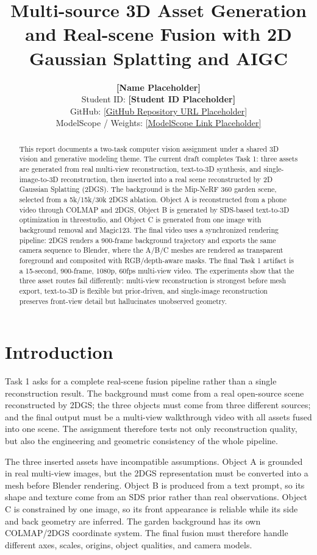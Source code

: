 \documentclass[10pt,twocolumn,letterpaper]{article}
\title{Multi-source 3D Asset Generation and Real-scene Fusion with 2D Gaussian Splatting and AIGC}
\author{
  \textbf{[Name Placeholder]} \\
  Student ID: \textbf{[Student ID Placeholder]} \\
  GitHub: \url{[GitHub Repository URL Placeholder]} \\
  ModelScope / Weights: \url{[ModelScope Link Placeholder]}
}
\date{}
\begin{document}
\maketitle

\begin{abstract}
This report documents a two-task computer vision assignment under a shared 3D vision and generative modeling theme.
The current draft completes Task 1: three assets are generated from real multi-view reconstruction, text-to-3D synthesis, and single-image-to-3D reconstruction, then inserted into a real scene reconstructed by 2D Gaussian Splatting (2DGS).
The background is the Mip-NeRF 360 garden scene, selected from a 5k/15k/30k 2DGS ablation.
Object A is reconstructed from a phone video through COLMAP and 2DGS, Object B is generated by SDS-based text-to-3D optimization in threestudio, and Object C is generated from one image with background removal and Magic123.
The final video uses a synchronized rendering pipeline: 2DGS renders a 900-frame background trajectory and exports the same camera sequence to Blender, where the A/B/C meshes are rendered as transparent foreground and composited with RGB/depth-aware masks.
The final Task 1 artifact is a 15-second, 900-frame, 1080p, 60fps multi-view video.
The experiments show that the three asset routes fail differently: multi-view reconstruction is strongest before mesh export, text-to-3D is flexible but prior-driven, and single-image reconstruction preserves front-view detail but hallucinates unobserved geometry.
\end{abstract}

\section{Introduction}
Task 1 asks for a complete real-scene fusion pipeline rather than a single reconstruction result.
The background must come from a real open-source scene reconstructed by 2DGS; the three objects must come from three different sources; and the final output must be a multi-view walkthrough video with all assets fused into one scene.
The assignment therefore tests not only reconstruction quality, but also the engineering and geometric consistency of the whole pipeline.

The three inserted assets have incompatible assumptions.
Object A is grounded in real multi-view images, but the 2DGS representation must be converted into a mesh before Blender rendering.
Object B is produced from a text prompt, so its shape and texture come from an SDS prior rather than real observations.
Object C is constrained by one image, so its front appearance is reliable while its side and back geometry are inferred.
The garden background has its own COLMAP/2DGS coordinate system.
The final fusion must therefore handle different axes, scales, origins, object qualities, and camera models.
\end{document}
